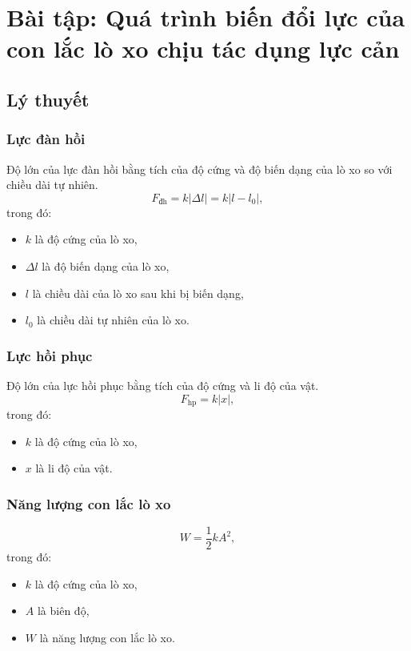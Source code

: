 
\chapter[Bài tập: Quá trình biến đổi lực của con lắc lò xo chịu tác dụng lực cản]{Bài tập: Quá trình biến đổi lực của con lắc lò xo chịu tác dụng lực cản}
\section{Lý thuyết}
\subsection{Lực đàn hồi}
Độ lớn của lực đàn hồi bằng tích của độ cứng và độ biến dạng của lò xo so với chiều dài tự nhiên.
\begin{equation*} 
	F_\text{đh}=k\left| \Delta l\right|=k\left| l-l_0\right|, 
\end{equation*}
trong đó:
\begin{itemize}
	\item  $k$ là độ cứng của lò xo,
	\item  $\Delta l$ là độ biến dạng của lò xo,
	\item $l$ là chiều dài của lò xo sau khi bị biến dạng,
	\item $l_0$ là chiều dài tự nhiên của lò xo.
\end{itemize}
\subsection{Lực hồi phục}
Độ lớn của lực hồi phục bằng tích của độ cứng và li độ của vật.
\begin{equation*} 
	F_\text{hp}=k\left|  x \right|, 
\end{equation*}
trong đó:
\begin{itemize}
	\item  $k$ là độ cứng của lò xo,
	\item  $x$ là li độ của vật.
	
\end{itemize}
\subsection{Năng lượng con lắc lò xo}
\begin{equation*} 
	W=\dfrac{1}{2}kA^2, 
\end{equation*}
trong đó:
\begin{itemize}
	\item  $k$ là độ cứng của lò xo,
	\item  $A$ là biên độ,
	\item $W$ là năng lượng con lắc lò xo.
\end{itemize}

